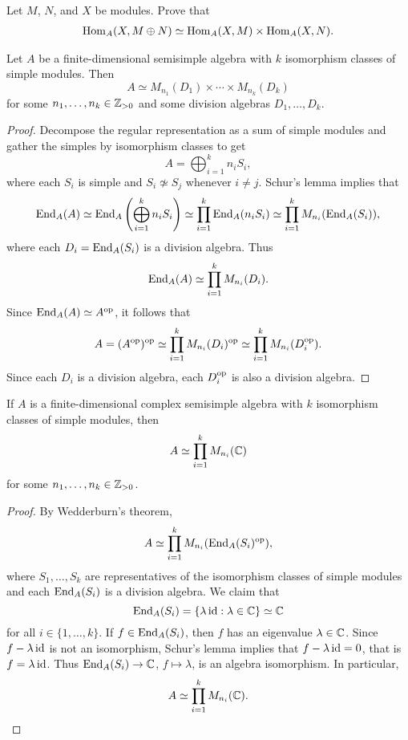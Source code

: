 \begin{exercise}
    Let $M$, $N$, and $X$ be modules. Prove that 
    \begin{align}
        \operatorname{Hom}_A(X,M\oplus N)\simeq\operatorname{Hom}_A(X,M)\times\operatorname{Hom}_A(X,N).
    \end{align}
\end{exercise}

\begin{theorem}
Let $A$ be a finite-dimensional semisimple algebra with  
$k$ isomorphism classes of simple modules. Then 
\[
A\simeq M_{n_1}(D_1)\times\cdots\times M_{n_k}(D_k)
\]
for some $n_1,\dots,n_k\in\mathbb{Z}_{>0}$ and some division algebras $D_1,\dots,D_k$.
\end{theorem}

\begin{proof}
    Decompose the regular representation as a sum of simple modules and
    gather the simples by isomorphism classes to get 	
    \[
	A=\bigoplus_{i=1}^k n_iS_i,
	\]
	where each $S_i$ is simple and $S_i\not\simeq S_j$ whenever 
	$i\ne j$. Schur's lemma implies that  
	\begin{align*}
		\operatorname{End}_A(A)\simeq\operatorname{End}_A\left(\bigoplus_{i=1}^kn_iS_i\right)
		\simeq \prod_{i=1}^k\operatorname{End}_A(n_iS_i)
		\simeq\prod_{i=1}^kM_{n_i}(\operatorname{End}_A(S_i)), 
	\end{align*}
	where each $D_i=\operatorname{End}_A(S_i)$ is a division algebra. 
    Thus
    \[
		\operatorname{End}_A(A)\simeq\prod_{i=1}^kM_{n_i}(D_i).
	\]
	Since $\operatorname{End}_A(A)\simeq
	A^{\operatorname{op}}$, it follows that  
	\begin{align*}
		A=(A^{\operatorname{op}})^{\operatorname{op}}\simeq \prod_{i=1}^kM_{n_i}(D_i)^{\operatorname{op}}\simeq \prod_{i=1}^kM_{n_i}(D_i^{\operatorname{op}}).
	\end{align*}
	Since each $D_i$ is a division algebra, each $D_i^{\operatorname{op}}$ is also a division algebra.
\end{proof}

\begin{corollary}[Mollien]
	If $A$ is a finite-dimensional complex semisimple algebra
	with $k$ isomorphism classes of simple modules, 
	then 
	\[
	A\simeq\prod_{i=1}^k M_{n_i}(\mathbb{C})
	\]  
	for some $n_1,\dots,n_k\in\mathbb{Z}_{>0}$. 
\end{corollary}

\begin{proof}
	By Wedderburn's theorem,  
	\[
	A\simeq \prod_{i=1}^k M_{n_i}(\operatorname{End}_A(S_i)^{\operatorname{op}}),
	\]
	where $S_1,\dots,S_k$ are representatives of the isomorphism classes of simple modules
	and each $\operatorname{End}_A(S_i)$ is a division algebra. We claim that 
	\[
	\operatorname{End}_A(S_i)=\{\lambda\operatorname{id}:\lambda\in\mathbb{C}\}\simeq\mathbb{C}
	\]
	for all $i\in\{1,\dots,k\}$. If  
	$f\in\operatorname{End}_A(S_i)$, then $f$ has an eigenvalue $\lambda\in\mathbb{C}$. Since  
	$f-\lambda\operatorname{id}$ is not an isomorphism, Schur's lemma implies that $f-\lambda\operatorname{id}=0$, 
	that is $f=\lambda\operatorname{id}$. Thus $\operatorname{End}_A(S_i)\to\mathbb{C}$, $f\mapsto\lambda$, 
	is an algebra isomorphism. In particular,  
	\[
	A\simeq \prod_{i=1}^k M_{n_i}(\mathbb{C}).\qedhere
	\]
\end{proof}

